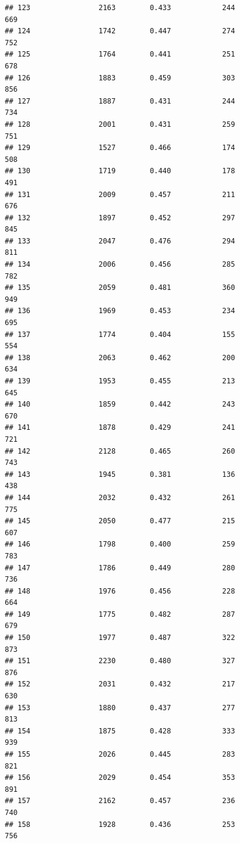 \documentclass[]{book}
\begin{document}
\begin{verbatim}
## 123                2163        0.433            244                669
## 124                1742        0.447            274                752
## 125                1764        0.441            251                678
## 126                1883        0.459            303                856
## 127                1887        0.431            244                734
## 128                2001        0.431            259                751
## 129                1527        0.466            174                508
## 130                1719        0.440            178                491
## 131                2009        0.457            211                676
## 132                1897        0.452            297                845
## 133                2047        0.476            294                811
## 134                2006        0.456            285                782
## 135                2059        0.481            360                949
## 136                1969        0.453            234                695
## 137                1774        0.404            155                554
## 138                2063        0.462            200                634
## 139                1953        0.455            213                645
## 140                1859        0.442            243                670
## 141                1878        0.429            241                721
## 142                2128        0.465            260                743
## 143                1945        0.381            136                438
## 144                2032        0.432            261                775
## 145                2050        0.477            215                607
## 146                1798        0.400            259                783
## 147                1786        0.449            280                736
## 148                1976        0.456            228                664
## 149                1775        0.482            287                679
## 150                1977        0.487            322                873
## 151                2230        0.480            327                876
## 152                2031        0.432            217                630
## 153                1880        0.437            277                813
## 154                1875        0.428            333                939
## 155                2026        0.445            283                821
## 156                2029        0.454            353                891
## 157                2162        0.457            236                740
## 158                1928        0.436            253                756

\end{verbatim}
\end{document}
